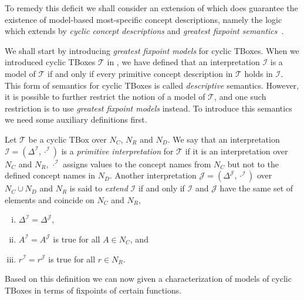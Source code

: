 To remedy this deficit we shall consider an extension of \ELbot which does guarantee the
existence of model-based most-specific concept descriptions, namely the logic \ELgfpbot
which extends \ELbot by \emph{cyclic concept descriptions} and \emph{greatest fixpoint
  semantics}~\cite{DBLP:conf/ijcai/Baader03a,sowa/Nebel91}.

We shall start by introducing \emph{greatest fixpoint models} for cyclic TBoxes.  When we
introduced cyclic TBoxes $\mathcal{T}$ in
, we have defined that an
interpretation $\mathcal{I}$ is a model of $\mathcal{T}$ if and only if every primitive
concept description in $\mathcal{T}$ holds in $\mathcal{I}$.  This form of semantics for
cyclic TBoxes is called \emph{descriptive} semantics.  However, it is possible to further
restrict the notion of a model of $\mathcal{T}$, and one such restriction is to use
\emph{greatest fixpoint models} instead.  To introduce this semantics we need some
auxiliary definitions first.

\begin{Definition}
  \label{def:primite-interpretations-and-extentions}
  Let $\mathcal{T}$ be a cyclic TBox over $N_C$, $N_R$ and $N_D$.  We say that an
  interpretation $\mathcal{I} = (\Delta^{\mathcal{I}}, \cdot^{\mathcal{I}})$ is a
  \emph{primitive interpretation} for $\mathcal{T}$ if it is an interpretation over $N_C$
  and $N_R$, \ie $\cdot^{\mathcal{I}}$ assigns values to the concept names from $N_C$ but
  not to the defined concept names in $N_D$.  Another interpretation $\mathcal{J} =
  (\Delta^{\mathcal{J}}, \cdot^{\mathcal{I}})$ over $N_C \cup N_D$ and $N_R$ is said to
  \emph{extend} $\mathcal{I}$ if and only if $\mathcal{I}$ and $\mathcal{J}$ have the same
  set of elements and coincide on $N_C$ and $N_R$, \ie
  \begin{enumerate}[i. ]
  \item $\Delta^{\mathcal{I}} = \Delta^{\mathcal{J}}$,
  \item $A^{\mathcal{I}} = A^{\mathcal{J}}$ is true for all $A \in N_C$, and
  \item $r^{\mathcal{I}} = r^{\mathcal{J}}$ is true for all $r \in N_R$.
  \end{enumerate}
\end{Definition}

Based on this definition we can now given a characterization of models of cyclic TBoxes in
terms of fixpoints of certain functions.

